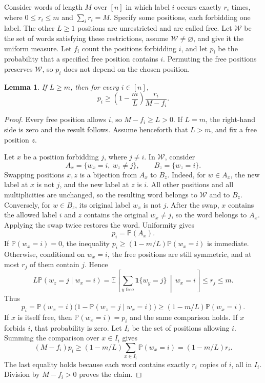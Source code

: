 \documentclass[11pt,reqno]{amsart}
\numberwithin{equation}{section}
\newtheorem{lemma}[theorem]{Lemma}
\theoremstyle{remark}
\theoremstyle{definition}
\newcommand{\ind}{\mathbf 1}
\begin{document}
Consider words of length $M$ over $[n]$ in which label $i$ occurs exactly $r_i$ times, where $0\le r_i\le m$ and $\sum_i r_i=M$. Specify some positions, each forbidding one label. The other $L\ge1$ positions are unrestricted and are called free. Let $\mathcal W$ be the set of words satisfying these restrictions, assume $\mathcal W\ne\varnothing$, and give it the uniform measure. Let $f_i$ count the positions forbidding $i$, and let $p_i$ be the probability that a specified free position contains $i$. Permuting the free positions preserves $\mathcal W$, so $p_i$ does not depend on the chosen position.
\begin{lemma}\label{low:lem:switch}
If $L\ge m$, then for every $i\in[n]$,
\[
 p_i\ge\left(1-\frac mL\right)\frac{r_i}{M-f_i}.
\]
\end{lemma}
\begin{proof}
Every free position allows $i$, so $M-f_i\ge L>0$. If $L=m$, the right-hand side is zero and the result follows. Assume henceforth that $L>m$, and fix a free position $z$.

Let $x$ be a position forbidding $j$, where $j\ne i$. In $\mathcal W$, consider
\[
 A_x=\{w_x=i,\ w_z\ne j\},\qquad B_z=\{w_z=i\}.
\]
Swapping positions $x,z$ is a bijection from $A_x$ to $B_z$. Indeed, for $w\in A_x$, the new label at $x$ is not $j$, and the new label at $z$ is $i$. All other positions and all multiplicities are unchanged, so the resulting word belongs to $\mathcal W$ and to $B_z$. Conversely, for $w\in B_z$, its original label $w_x$ is not $j$. After the swap, $x$ contains the allowed label $i$ and $z$ contains the original $w_x\ne j$, so the word belongs to $A_x$. Applying the swap twice restores the word. Uniformity gives
\[
 p_i=\mathbb P(A_x).
\]
If $\mathbb P(w_x=i)=0$, the inequality $p_i\ge(1-m/L)\mathbb P(w_x=i)$ is immediate. Otherwise, conditional on $w_x=i$, the free positions are still symmetric, and at most $r_j$ of them contain $j$. Hence
\[
 L\mathbb P(w_z=j\mid w_x=i)
 =\mathbb E\left[\sum_{y\text{ free}}\ind\{w_y=j\}\,\middle|\,w_x=i\right]
 \le r_j\le m.
\]
Thus
\[
 p_i=\mathbb P(w_x=i)
       \bigl(1-\mathbb P(w_z=j\mid w_x=i)\bigr)
 \ge(1-m/L)\mathbb P(w_x=i).
\]
If $x$ is itself free, then $\mathbb P(w_x=i)=p_i$ and the same comparison holds. If $x$ forbids $i$, that probability is zero. Let $I_i$ be the set of positions allowing $i$. Summing the comparison over $x\in I_i$ gives
\[
 (M-f_i)p_i
 \ge(1-m/L)\sum_{x\in I_i}\mathbb P(w_x=i)
 =(1-m/L)r_i.
\]
The last equality holds because each word contains exactly $r_i$ copies of $i$, all in $I_i$. Division by $M-f_i>0$ proves the claim.
\end{proof}
\end{document}
